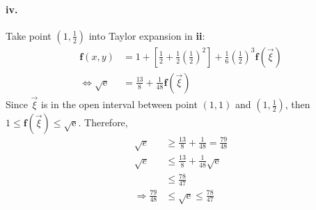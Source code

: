 \documentclass[11pt, a4paper]{article}
\begin{document}
\paragraph{iv.} Take point $(1, \frac{1}{2})$ into Taylor expansion in \textbf{ii}:
$$\begin{aligned}
    \bm{f}(x, y) &= 1 + [\frac{1}{2} + \frac{1}{2}(\frac{1}{2}) ^ 2] + \frac{1}{6}(\frac{1}{2}) ^ 3 \bm{f}(\vec{\xi}) \\
    \Leftrightarrow
    \sqrt{\mathrm{e}} &= \frac{13}{8} + \frac{1}{48}\bm{f}(\vec{\xi})
\end{aligned}$$
Since $\vec{\xi}$ is in the open interval between point $(1, 1)$ and $(1, \frac{1}{2})$, then $1 \leq \bm{f}(\vec{\xi}) \leq \sqrt{\mathrm{e}}$. Therefore, 
$$\begin{aligned}
    \sqrt{e} &\geq \frac{13}{8} + \frac{1}{48} = \frac{79}{48} \\
    \sqrt{e} &\leq \frac{13}{8} + \frac{1}{48}\sqrt{\mathrm{e}} \\
    &\leq \frac{78}{47} \\
    \Rightarrow
    \frac{79}{48} &\leq \sqrt{\mathrm{e}} \leq \frac{78}{47}
\end{aligned}$$
\end{document}
